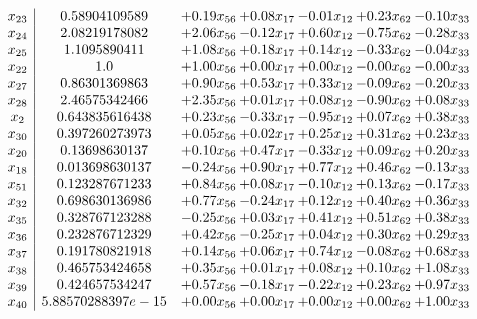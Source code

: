 \documentclass[8pt]{article}
\begin{document}
\[\begin{array}{c| c c@{\hskip 2pt} c@{\hskip 2pt} c@{\hskip 2pt} c@{\hskip 2pt} c@{\hskip 2pt} }
 x_{23}   &  0.58904109589 & +  0.19 x_{56} & +  0.08 x_{17} & -0.01 x_{12} & +  0.23 x_{62} & -0.10 x_{33}\\
 x_{24}   &  2.08219178082 & +  2.06 x_{56} & -0.12 x_{17} & +  0.60 x_{12} & -0.75 x_{62} & -0.28 x_{33}\\
 x_{25}   &  1.1095890411 & +  1.08 x_{56} & +  0.18 x_{17} & +  0.14 x_{12} & -0.33 x_{62} & -0.04 x_{33}\\
 x_{22}   &  1.0 & +  1.00 x_{56} & +  0.00 x_{17} & +  0.00 x_{12} & -0.00 x_{62} & -0.00 x_{33}\\
 x_{27}   &  0.86301369863 & +  0.90 x_{56} & +  0.53 x_{17} & +  0.33 x_{12} & -0.09 x_{62} & -0.20 x_{33}\\
 x_{28}   &  2.46575342466 & +  2.35 x_{56} & +  0.01 x_{17} & +  0.08 x_{12} & -0.90 x_{62} & +  0.08 x_{33}\\
 x_{2}   &  0.643835616438 & +  0.23 x_{56} & -0.33 x_{17} & -0.95 x_{12} & +  0.07 x_{62} & +  0.38 x_{33}\\
 x_{30}   &  0.397260273973 & +  0.05 x_{56} & +  0.02 x_{17} & +  0.25 x_{12} & +  0.31 x_{62} & +  0.23 x_{33}\\
 x_{20}   &  0.13698630137 & +  0.10 x_{56} & +  0.47 x_{17} & -0.33 x_{12} & +  0.09 x_{62} & +  0.20 x_{33}\\
 x_{18}   &  0.013698630137 & -0.24 x_{56} & +  0.90 x_{17} & +  0.77 x_{12} & +  0.46 x_{62} & -0.13 x_{33}\\
 x_{51}   &  0.123287671233 & +  0.84 x_{56} & +  0.08 x_{17} & -0.10 x_{12} & +  0.13 x_{62} & -0.17 x_{33}\\
 x_{32}   &  0.698630136986 & +  0.77 x_{56} & -0.24 x_{17} & +  0.12 x_{12} & +  0.40 x_{62} & +  0.36 x_{33}\\
 x_{35}   &  0.328767123288 & -0.25 x_{56} & +  0.03 x_{17} & +  0.41 x_{12} & +  0.51 x_{62} & +  0.38 x_{33}\\
 x_{36}   &  0.232876712329 & +  0.42 x_{56} & -0.25 x_{17} & +  0.04 x_{12} & +  0.30 x_{62} & +  0.29 x_{33}\\
 x_{37}   &  0.191780821918 & +  0.14 x_{56} & +  0.06 x_{17} & +  0.74 x_{12} & -0.08 x_{62} & +  0.68 x_{33}\\
 x_{38}   &  0.465753424658 & +  0.35 x_{56} & +  0.01 x_{17} & +  0.08 x_{12} & +  0.10 x_{62} & +  1.08 x_{33}\\
 x_{39}   &  0.424657534247 & +  0.57 x_{56} & -0.18 x_{17} & -0.22 x_{12} & +  0.23 x_{62} & +  0.97 x_{33}\\
 x_{40}   &  5.88570288397e-15 & +  0.00 x_{56} & +  0.00 x_{17} & +  0.00 x_{12} & +  0.00 x_{62} & +  1.00 x_{33}\\

\end{array}\]
\end{document}
